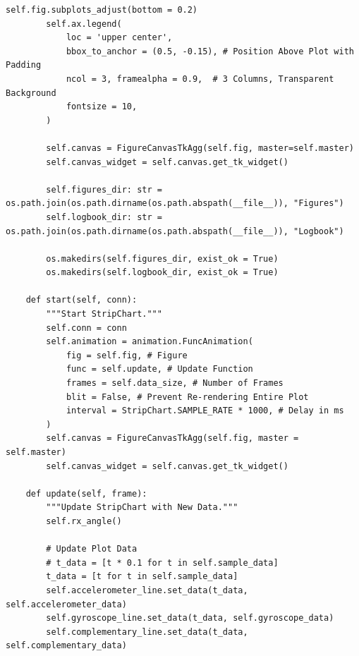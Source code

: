 \documentclass{article}
\begin{document}
\begin{lstlisting}[caption={Python Stripchart}, label={lst:stripchart_code}]
        self.fig.subplots_adjust(bottom = 0.2)
        self.ax.legend(
            loc = 'upper center',
            bbox_to_anchor = (0.5, -0.15), # Position Above Plot with Padding
            ncol = 3, framealpha = 0.9,  # 3 Columns, Transparent Background
            fontsize = 10,
        )

        self.canvas = FigureCanvasTkAgg(self.fig, master=self.master)
        self.canvas_widget = self.canvas.get_tk_widget()

        self.figures_dir: str = os.path.join(os.path.dirname(os.path.abspath(__file__)), "Figures")
        self.logbook_dir: str = os.path.join(os.path.dirname(os.path.abspath(__file__)), "Logbook")

        os.makedirs(self.figures_dir, exist_ok = True)
        os.makedirs(self.logbook_dir, exist_ok = True)

    def start(self, conn):
        """Start StripChart."""
        self.conn = conn
        self.animation = animation.FuncAnimation(
            fig = self.fig, # Figure
            func = self.update, # Update Function
            frames = self.data_size, # Number of Frames
            blit = False, # Prevent Re-rendering Entire Plot
            interval = StripChart.SAMPLE_RATE * 1000, # Delay in ms
        )
        self.canvas = FigureCanvasTkAgg(self.fig, master = self.master)
        self.canvas_widget = self.canvas.get_tk_widget()

    def update(self, frame):
        """Update StripChart with New Data."""
        self.rx_angle()

        # Update Plot Data
        # t_data = [t * 0.1 for t in self.sample_data]
        t_data = [t for t in self.sample_data]
        self.accelerometer_line.set_data(t_data, self.accelerometer_data)
        self.gyroscope_line.set_data(t_data, self.gyroscope_data)
        self.complementary_line.set_data(t_data, self.complementary_data)


\end{lstlisting}
\end{document}
